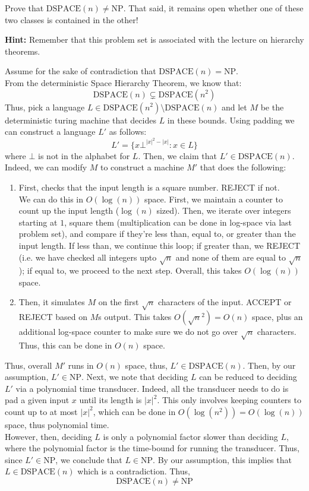 \documentclass[12pt]{article}
\begin{document}
\newpage
\begin{problem}{2}
Prove that $\mathrm{DSPACE}(n) \neq \mathrm{NP}$. That said, it remains open whether one of these two classes is contained in the other!

\textbf{Hint:} Remember that this problem set is associated with the lecture on hierarchy theorems.
\end{problem}

\begin{solution}
    Assume for the sake of contradiction that $\text{DSPACE}(n) = \text{NP}$. \\
    From the deterministic Space Hierarchy Theorem, we know that: 
    \[ \text{DSPACE}(n) \subsetneq \text{DSPACE}(n^2)\]
    Thus, pick a language $L \in \text{DSPACE}(n^2) \setminus \text{DSPACE}(n)$ and let $M$ be the deterministic turing machine that decides $L$ in these bounds. Using padding we can construct a language $L'$ as follows: 
    \[ L' = \{ x\bot^{|x|^2-|x|} : x \in L\}\]
    where $\bot$ is not in the alphabet for $L$. Then, we claim that $L' \in \text{DSPACE}(n)$. Indeed, we can modify $M$ to construct a machine $M'$ that does the following: 
    \begin{enumerate}
        \item First, checks that the input length is a square number. REJECT if not. \\ 
        We can do this in $O(\log(n))$ space. First, we maintain a counter to count up the input length ($\log(n)$ sized). Then, we iterate over integers starting at $1$, square them (multiplication can be done in log-space via last problem set), and compare if they're less than, equal to, or greater than the input length. If less than, we continue this loop; if greater than, we REJECT (i.e. we have checked all integers upto $\sqrt{n}$ and none of them are equal to $\sqrt{n}$); if equal to, we proceed to the next step. Overall, this takes $O(\log(n))$ space.
        \item Then, it simulates $M$ on the first $\sqrt{n}$ characters of the input. ACCEPT or REJECT based on $M$s output. This takes $O(\sqrt{n}^{2}) = O(n)$ space, plus an additional log-space counter to make sure we do not go over $\sqrt{n}$ characters. Thus, this can be done in $O(n)$ space. 
    \end{enumerate}  
    Thus, overall $M'$ runs in $O(n)$ space, thus, $L' \in \text{DSPACE}(n)$. Then, by our assumption, $L' \in \text{NP}$. \bbni
    Next, we note that deciding $L$ can be reduced to deciding $L'$ via a polynomial time transducer. Indeed, all the transducer needs to do is pad a given input $x$ until its length is $|x|^2$. This only involves keeping counters to count up to at most $|x|^2$, which can be done in $O(\log(n^2)) = O(\log(n))$ space, thus polynomial time. \\
    However, then, deciding $L$ is only a polynomial factor slower than deciding $L$, where the polynomial factor is the time-bound for running the transducer. Thus, since $L' \in \text{NP}$, we conclude that $L \in \text{NP}$. \bbni  
    By our assumption, this implies that $L \in \text{DSPACE}(n)$ which is a contradiction. Thus, 
    \[ \text{DSPACE}(n) \neq \text{NP} \]
\end{solution}
\end{document}
